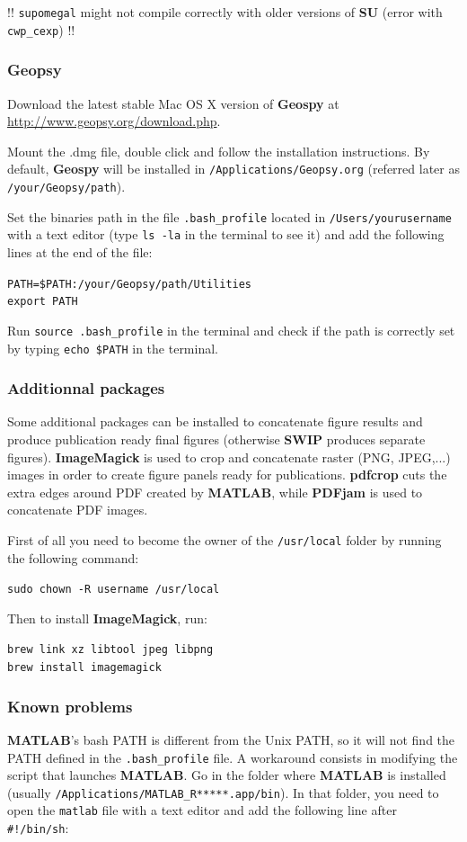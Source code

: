 \documentclass[twoside,a4paper]{article}
\def\SWIP{\textbf{SWIP}}
\def\SU{\textbf{SU}}
\def\Geopsy{\textbf{Geospy}}
\def\ImageMagick{\textbf{ImageMagick}}
\def\PDFjam{\textbf{PDFjam}}
\def\pdfcrop{\textbf{pdfcrop}}
\def\MATLAB{\textbf{MATLAB}}
\begin{document}
!! \verb|supomegal| might not compile correctly with older versions of {\SU} (error with \verb|cwp_cexp|) !!

\subsubsection{Geopsy}
Download the latest stable Mac OS X version of {\Geopsy} at \url{http://www.geopsy.org/download.php}.

Mount the .dmg file, double click and follow the installation instructions. By default, {\Geopsy} will be installed in \verb|/Applications/Geopsy.org| (referred later as \verb|/your/Geopsy/path|).

Set the binaries path in the file \verb|.bash_profile| located in \verb|/Users/yourusername| with a text editor (type \verb|ls -la| in the terminal to see it) and add the following lines at the end of the file:

\verb|PATH=$PATH:/your/Geopsy/path/Utilities|\\
\verb|export PATH|

Run \verb|source .bash_profile| in the terminal and check if the path is correctly set by typing \verb|echo $PATH| in the terminal.

\subsubsection{Additionnal packages}
Some additional packages can be installed to concatenate figure results and produce publication ready final figures (otherwise {\SWIP} produces separate figures). {\ImageMagick} is used to crop and concatenate raster (PNG, JPEG,...) images in order to create figure panels ready for publications. {\pdfcrop} cuts the extra edges around PDF created by {\MATLAB}, while {\PDFjam} is used to concatenate PDF images.

First of all you need to become the owner of the \verb|/usr/local| folder by running the following command:

\verb|sudo chown -R username /usr/local|

Then to install {\ImageMagick}, run:

\verb|brew link xz libtool jpeg libpng|\\
\verb|brew install imagemagick|

\subsubsection{Known problems}
{\MATLAB}'s bash PATH is different from the Unix PATH, so it will not find the PATH defined in the \verb|.bash_profile| file. A workaround consists in modifying the script that launches {\MATLAB}. Go in the folder where {\MATLAB} is installed (usually \verb|/Applications/MATLAB_R*****.app/bin|). In that folder, you need to open the \verb|matlab| file with a text editor and add the following line after \verb|#!/bin/sh|:
\end{document}
